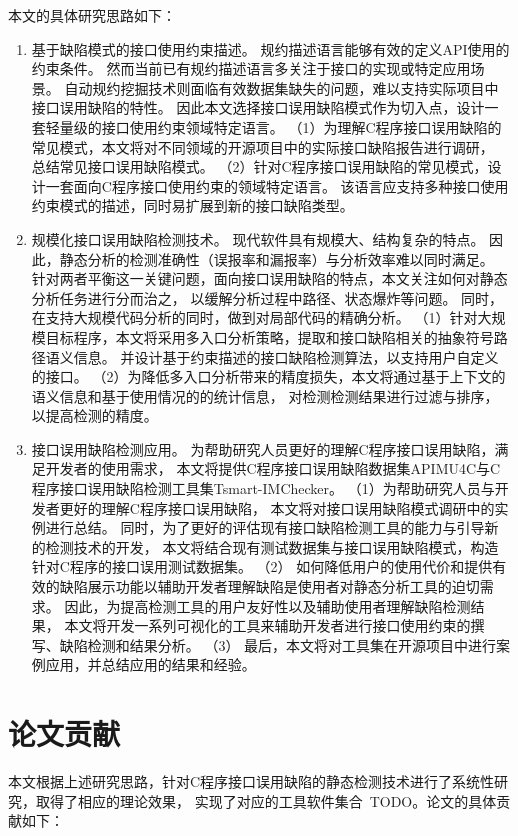 本文的具体研究思路如下：
\begin{enumerate}
	\item {\kaishu 基于缺陷模式的接口使用约束描述。}
	规约描述语言能够有效的定义API使用的约束条件。
	然而当前已有规约描述语言多关注于接口的实现或特定应用场景。
	自动规约挖掘技术则面临有效数据集缺失的问题，难以支持实际项目中接口误用缺陷的特性。
	因此本文选择接口误用缺陷模式作为切入点，设计一套轻量级的接口使用约束领域特定语言。
	（1）为理解C程序接口误用缺陷的常见模式，本文将对不同领域的开源项目中的实际接口缺陷报告进行调研，
	总结常见接口误用缺陷模式。
	（2）针对C程序接口误用缺陷的常见模式，设计一套面向C程序接口使用约束的领域特定语言。
	该语言应支持多种接口使用约束模式的描述，同时易扩展到新的接口缺陷类型。
	
	\item {\kaishu 规模化接口误用缺陷检测技术。}
	现代软件具有规模大、结构复杂的特点。
	因此，静态分析的检测准确性（误报率和漏报率）与分析效率难以同时满足。
	针对两者平衡这一关键问题，面向接口误用缺陷的特点，本文关注如何对静态分析任务进行分而治之，
	以缓解分析过程中路径、状态爆炸等问题。
	同时，在支持大规模代码分析的同时，做到对局部代码的精确分析。
	（1）针对大规模目标程序，本文将采用多入口分析策略，提取和接口缺陷相关的抽象符号路径语义信息。
	并设计基于约束描述的接口缺陷检测算法，以支持用户自定义的接口。
	（2）为降低多入口分析带来的精度损失，本文将通过基于上下文的语义信息和基于使用情况的的统计信息，
	对检测检测结果进行过滤与排序，以提高检测的精度。
	
	\item {\kaishu 接口误用缺陷检测应用。}
	为帮助研究人员更好的理解C程序接口误用缺陷，满足开发者的使用需求，
	本文将提供C程序接口误用缺陷数据集APIMU4C与C程序接口误用缺陷检测工具集Tsmart-IMChecker。
	（1）为帮助研究人员与开发者更好的理解C程序接口误用缺陷，
	本文将对接口误用缺陷模式调研中的实例进行总结。
	同时，为了更好的评估现有接口缺陷检测工具的能力与引导新的检测技术的开发，
	本文将结合现有测试数据集与接口误用缺陷模式，构造针对C程序的接口误用测试数据集。
	（2）
	如何降低用户的使用代价和提供有效的缺陷展示功能以辅助开发者理解缺陷是使用者对静态分析工具的迫切需求。
	因此，为提高检测工具的用户友好性以及辅助使用者理解缺陷检测结果，
	本文将开发一系列可视化的工具来辅助开发者进行接口使用约束的撰写、缺陷检测和结果分析。
	（3）
	最后，本文将对工具集在开源项目中进行案例应用，并总结应用的结果和经验。	
\end{enumerate}




\section{论文贡献}
本文根据上述研究思路，针对C程序接口误用缺陷的静态检测技术进行了系统性研究，取得了相应的理论效果，
实现了对应的工具软件集合~\cite{19-icse-imchecker}TODO。论文的具体贡献如下：

